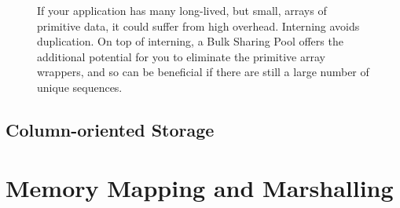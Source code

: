 \begin{figure}
	\caption{If your application has many long-lived, but small, arrays of
	primitive data, it could suffer from high overhead. Interning avoids
	duplication. On top of interning, a Bulk Sharing Pool offers the additional
	potential for you to eliminate the primitive array wrappers, and so can be
	beneficial if there are still a large number of unique sequences.}
	\label{fig:bulk-sharing-pool}
\end{figure}



\subsection{Column-oriented Storage}
\label{sec:column-oriented}

\section{Memory Mapping and Marshalling}